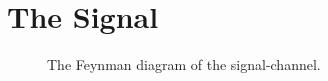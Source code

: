\section{The Signal}

\begin{figure}
    \centering
    \caption{The Feynman diagram of the signal-channel.}
\end{figure}
